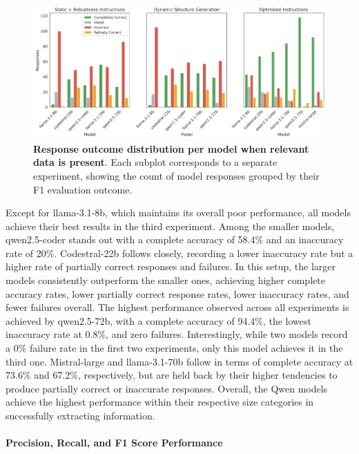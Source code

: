 \documentclass{DESSThesis}
\begin{document}
\begin{figure}[ht]
    \centering
    \includegraphics[width=\linewidth]{img/Results/Second Experimental Phase/Response Outcome Distribution per Model - With Data.png}
    \caption[Response outcome distribution per model when relevant data is present]{\textbf{Response outcome distribution per model when relevant data is present}. Each subplot corresponds to a separate experiment, showing the count of model responses grouped by their F1 evaluation outcome.}
    \label{fig:outcome_distribution_data_second}
\end{figure}

Except for llama-3.1-8b, which maintains its overall poor performance, all models achieve their best results in the third experiment. Among the smaller models, qwen2.5-coder stands out with a complete accuracy of 58.4\% and an inaccuracy rate of 20\%. Codestral-22b follows closely, recording a lower inaccuracy rate but a higher rate of partially correct responses and failures. In this setup, the larger models consistently outperform the smaller ones, achieving higher complete accuracy rates, lower partially correct response rates, lower inaccuracy rates, and fewer failures overall. The highest performance observed across all experiments is achieved by qwen2.5-72b, with a complete accuracy of 94.4\%, the lowest inaccuracy rate at 0.8\%, and zero failures. Interestingly, while two models record a 0\% failure rate in the first two experiments, only this model achieves it in the third one. Mistral-large and llama-3.1-70b follow in terms of complete accuracy at 73.6\% and 67.2\%, respectively, but are held back by their higher tendencies to produce partially correct or inaccurate responses. Overall, the Qwen models achieve the highest performance within their respective size categories in successfully extracting information.

\paragraph{Precision, Recall, and F1 Score Performance}\mbox{}\\
\end{document}
